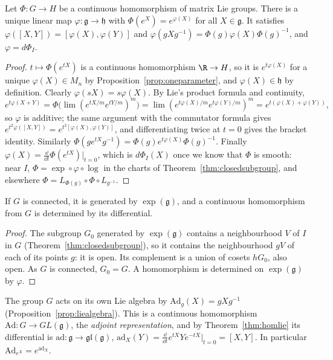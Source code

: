 \begin{theorem}\label{thm:homlie}
Let $\Phi\colon G\to H$ be a continuous homomorphism of matrix Lie groups. There is a unique linear map $\varphi\colon\mathfrak g\to\mathfrak h$ with $\Phi(e^X)=e^{\varphi(X)}$ for all $X\in\mathfrak g$. It satisfies
$\varphi([X,Y])=[\varphi(X),\varphi(Y)]$ and $\varphi(gXg^{-1})=\Phi(g)\varphi(X)\Phi(g)^{-1}$, and $\varphi=d\Phi_I$.
\end{theorem}

\begin{proof}
$t\mapsto\Phi(e^{tX})$ is a continuous homomorphism $\R\to H$, so it is $e^{t\varphi(X)}$ for a unique $\varphi(X)\in M_n$ by Proposition~\ref{prop:oneparameter}, and $\varphi(X)\in\mathfrak h$ by definition. Clearly $\varphi(sX)=s\varphi(X)$. By
Lie's product formula and continuity,
\[e^{t\varphi(X+Y)}=\Phi\bigl(\lim(e^{tX/m}e^{tY/m})^m\bigr)=\lim(e^{t\varphi(X)/m}e^{t\varphi(Y)/m})^m=e^{t(\varphi(X)+\varphi(Y))},\]
so $\varphi$ is additive; the same argument with the commutator formula gives $e^{t^2\varphi([X,Y])}=e^{t^2[\varphi(X),\varphi(Y)]}$, and differentiating twice at $t=0$ gives the bracket identity. Similarly
$\Phi(ge^{tX}g^{-1})=\Phi(g)e^{t\varphi(X)}\Phi(g)^{-1}$. Finally $\varphi(X)=\frac{\dd}{\dd t}\Phi(e^{tX})|_{t=0}$, which is $d\Phi_I(X)$ once we know that $\Phi$ is smooth: near $I$, $\Phi=\exp\circ\varphi\circ\log$ in the charts of
Theorem~\ref{thm:closedsubgroup}, and elsewhere $\Phi=L_{\Phi(g)}\circ\Phi\circ L_{g^{-1}}$.
\end{proof}

\begin{proposition}\label{prop:connectedgen}
If $G$ is connected, it is generated by $\exp(\mathfrak g)$, and a continuous homomorphism from $G$ is determined by its differential.
\end{proposition}

\begin{proof}
The subgroup $G_0$ generated by $\exp(\mathfrak g)$ contains a neighbourhood $V$ of $I$ in $G$ (Theorem~\ref{thm:closedsubgroup}), so it contains the neighbourhood $gV$ of each of its points $g$: it is open.
Its complement is a union of cosets $hG_0$, also open. As $G$ is connected, $G_0=G$. A homomorphism is determined on $\exp(\mathfrak g)$ by $\varphi$.
\end{proof}

The group $G$ acts on its own Lie algebra by $\mathrm{Ad}_g(X)=gXg^{-1}$ (Proposition~\ref{prop:liealgebra}). This is a continuous homomorphism $\mathrm{Ad}\colon G\to GL(\mathfrak g)$, the \emph{adjoint representation}, and by
Theorem~\ref{thm:homlie} its differential is $\mathrm{ad}\colon\mathfrak g\to\mathfrak{gl}(\mathfrak g)$, $\mathrm{ad}_X(Y)=\frac{\dd}{\dd t}e^{tX}Ye^{-tX}|_{t=0}=[X,Y]$. In particular $\mathrm{Ad}_{e^X}=e^{\mathrm{ad}_X}$.

